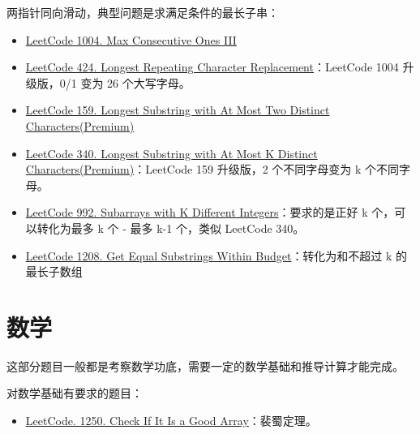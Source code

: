 两指针同向滑动，典型问题是求满足条件的最长子串：
\begin{itemize}
  \item
    \href{https://leetcode.com/problems/max-consecutive-ones-iii/}{LeetCode 1004. Max Consecutive Ones III}
  \item
    \href{https://leetcode.com/problems/longest-repeating-character-replacement/}{LeetCode
      424. Longest Repeating Character Replacement}：LeetCode 1004 升级版，0/1 变为 26 个大写字母。
  \item
    \href{https://leetcode.com/problems/longest-substring-with-at-most-two-distinct-characters}{LeetCode
      159. Longest Substring with At Most Two Distinct Characters(Premium)}
  \item
    \href{https://leetcode.com/problems/longest-substring-with-at-most-k-distinct-characters}{LeetCode
      340. Longest Substring with At Most K Distinct Characters(Premium)}：LeetCode 159
    升级版，2 个不同字母变为 k 个不同字母。
  \item
    \href{https://leetcode.com/problems/subarrays-with-k-different-integers}{LeetCode
    992. Subarrays with K Different Integers}：要求的是正好 k 个，可以转化为最多
  k 个 - 最多 k-1 个，类似 LeetCode 340。
  \item
    \href{https://leetcode.com/problems/get-equal-substrings-within-budget/}{LeetCode
      1208. Get Equal Substrings Within Budget}：转化为和不超过 k 的最长子数组

  
\end{itemize}

\section{数学}

这部分题目一般都是考察数学功底，需要一定的数学基础和推导计算才能完成。

对数学基础有要求的题目：

\begin{itemize}
  \item
    \href{https://leetcode.com/problems/check-if-it-is-a-good-array/}{LeetCode.
      1250. Check If It Is a Good Array}：裴蜀定理。
\end{itemize}


